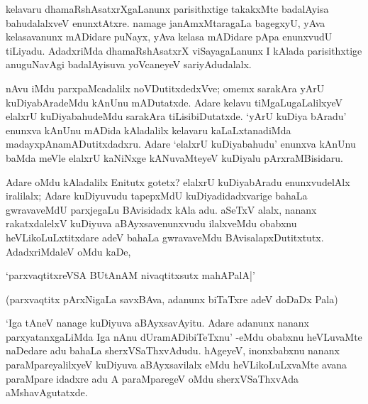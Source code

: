 kelavaru dhamaRshAsatxrXgaLanunx parisithxtige takakxMte badalAyisa bahudalalxveV enunxtAtxre. namage janAmxMtaragaLa bagegxyU, yAva kelasavanunx mADidare puNayx, yAva kelasa mADidare pApa enunxvudU tiLiyadu. AdadxriMda dhamaRshAsatxrX viSayagaLanunx I kAlada parisithxtige anuguNavAgi badalAyisuva yoVcaneyeV sariyAdudalalx. 

nAvu iMdu parxpaMcadalilx noVDutitxdedxVve; omemx sarakAra yArU kuDiyabAradeMdu kAnUnu mADutatxde. Adare kelavu tiMgaLugaLalilxyeV elalxrU kuDiyabahudeMdu sarakAra tiLisibiDutatxde. `yArU kuDiya bAradu' enunxva kAnUnu mADida kAladalilx kelavaru kaLaLxtanadiMda madayxpAnamADutitxdadxru. Adare `elalxrU kuDiyabahudu' enunxva kAnUnu baMda meVle elalxrU kaNiNxge kANuvaMteyeV kuDiyalu pArxraMBisidaru.

Adare oMdu kAladalilx Enitutx gotetx? elalxrU kuDiyabAradu enunxvudelAlx iralilalx; Adare kuDiyuvudu tapepxMdU kuDiyadidadxvarige bahaLa gwravaveMdU parxjegaLu BAvisidadx kAla adu. aSeTxV alalx, nananx rakatxdalelxV kuDiyuva aBAyxsavenunxvudu ilalxveMdu obabxnu heVLikoLuLxtitxdare adeV bahaLa gwravaveMdu BAvisalapxDutitxtutx. AdadxriMdaleV oMdu kaDe, 

\begin{shloka}
`parxvaqtitxreVSA BUtAnAM nivaqtitxsutx mahAPalA|'
\end{shloka}

(parxvaqtitx pArxNigaLa savxBAva, adanunx biTaTxre adeV doDaDx Pala)

`Iga tAneV nanage kuDiyuva aBAyxsavAyitu. Adare adanunx nananx parxyatanxgaLiMda Iga nAnu dUramADibiTeTxnu' -eMdu obabxnu heVLuvaMte naDedare adu bahaLa sherxVSaThxvAdudu. hAgeyeV, inonxbabxnu nananx paraMpareyalilxyeV kuDiyuva aBAyxsavilalx eMdu heVLikoLuLxvaMte avana paraMpare idadxre adu A paraMparegeV oMdu sherxVSaThxvAda aMshavAgutatxde. 

